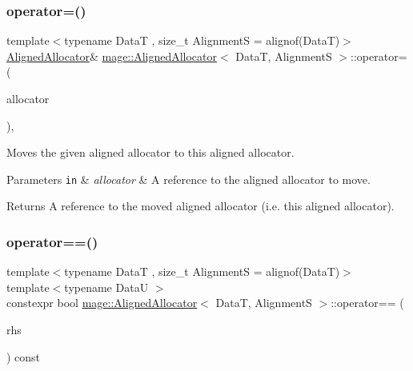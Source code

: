 \subsubsection{\texorpdfstring{operator=()}{operator=()}\hspace{0.1cm}{\footnotesize\ttfamily [2/2]}}
{\footnotesize\ttfamily template$<$typename DataT , size\+\_\+t AlignmentS = alignof(\+Data\+T)$>$ \\
\hyperlink{classmage_1_1_aligned_allocator}{Aligned\+Allocator}\& \hyperlink{classmage_1_1_aligned_allocator}{mage\+::\+Aligned\+Allocator}$<$ DataT, AlignmentS $>$\+::operator= (\begin{DoxyParamCaption}\item[{\hyperlink{classmage_1_1_aligned_allocator}{Aligned\+Allocator}$<$ DataT, AlignmentS $>$ \&\&}]{allocator }\end{DoxyParamCaption})\hspace{0.3cm}{\ttfamily [default]}, {\ttfamily [noexcept]}}

Moves the given aligned allocator to this aligned allocator.


\begin{DoxyParams}[1]{Parameters}
\mbox{\tt in}  & {\em allocator} & A reference to the aligned allocator to move. \\
\hline
\end{DoxyParams}
\begin{DoxyReturn}{Returns}
A reference to the moved aligned allocator (i.\+e. this aligned allocator). 
\end{DoxyReturn}
\hypertarget{classmage_1_1_aligned_allocator_a4f3c027b1f57bce8d2160b65eee8e49c}{}\label{classmage_1_1_aligned_allocator_a4f3c027b1f57bce8d2160b65eee8e49c} 
\subsubsection{\texorpdfstring{operator==()}{operator==()}}
{\footnotesize\ttfamily template$<$typename DataT , size\+\_\+t AlignmentS = alignof(\+Data\+T)$>$ \\
template$<$typename DataU $>$ \\
constexpr bool \hyperlink{classmage_1_1_aligned_allocator}{mage\+::\+Aligned\+Allocator}$<$ DataT, AlignmentS $>$\+::operator== (\begin{DoxyParamCaption}\item[{\mbox{[}\mbox{[}maybe\+\_\+unused\mbox{]} \mbox{]} const \hyperlink{classmage_1_1_aligned_allocator}{Aligned\+Allocator}$<$ DataU, AlignmentS $>$ \&}]{rhs }\end{DoxyParamCaption}) const\hspace{0.3cm}{\ttfamily [noexcept]}}

